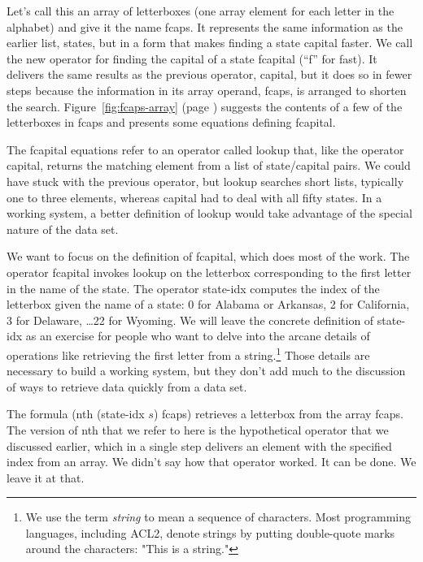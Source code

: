 Let's call this an array of letterboxes
(one array element for each letter in the alphabet)
and give it the name \textsf{fcaps}.
It represents the same information as the earlier list, \textsf{states},
but in a form that makes finding a state capital faster.
We call the new operator for finding the capital of a state
\textsf{fcapital} (``f'' for fast).
It delivers the same results
as the previous operator, \textsf{capital},
but it does so in fewer steps because the information in its array operand,
\textsf{fcaps}, is arranged to shorten the search.
Figure~\ref{fig:fcaps-array} (page \pageref{fig:fcaps-array})
suggests the contents of a few
of the letterboxes in \textsf{fcaps} and presents some
equations defining \textsf{fcapital}.

The \textsf{fcapital} equations refer to an operator
called \textsf{lookup} that, like the operator \textsf{capital},
returns the matching element from a list of state/capital pairs.
We could have stuck with the previous operator,
but \textsf{lookup} searches short lists,
typically one to three elements,
whereas \textsf{capital} had to deal with all fifty states.
In a working system,
a better definition of \textsf{lookup}
would take advantage of the special nature of the data set.

We want to focus on the definition of \textsf{fcapital},
which does most of the work.
The operator \textsf{fcapital} invokes \textsf{lookup}
on the letterbox corresponding to the first letter
in the name of the state.
The operator \textsf{state-idx} computes the index
of the letterbox given the name of a state:
0 for Alabama or Arkansas, 2 for California,
3 for Delaware, \dots 22 for  Wyoming.
We will leave the concrete
definition of \textsf{state-idx} as an exercise for
people who want to delve into the arcane details of
operations like retrieving the first letter from a
string.\footnote{We use the term \emph{string}
to mean a sequence of characters.
Most programming languages, including ACL2,
denote strings by putting double-quote marks
around the characters: \textsf{"This is a string."}}
Those details are necessary to build a working system,
but they don't add much to the discussion of ways
to retrieve data quickly from a data set.

The formula
\textsf{(nth (state-idx $s$) fcaps)}
retrieves a letterbox from the array \textsf{fcaps}.
The version of \textsf{nth} that we refer to here
is the hypothetical operator that we discussed earlier,
which in a single step delivers an element
with the specified index from an array.
We didn't say how that operator worked.
It can be done. We leave it at that.

